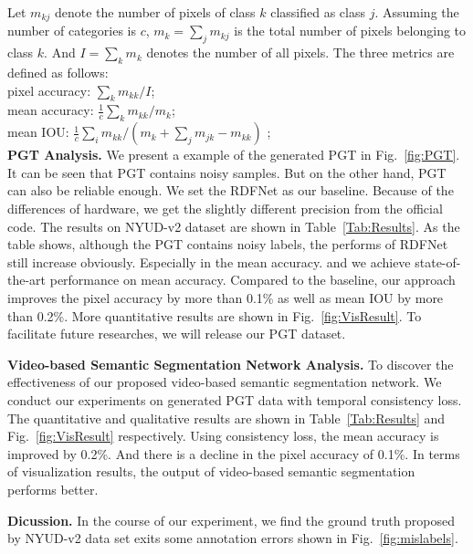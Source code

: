 %
Let $m_{kj}$ denote the number of pixels of class ${k}$ classified as class ${j}$.
%
Assuming the number of categories is $c$, $m_{k} = \sum_{j}m_{kj}$ is the total number of pixels belonging to class $k$. 
%
And $I = \sum_{k}m_{k}$ denotes the number of all pixels.
%
The three metrics are defined as follows:\\
\renewcommand{\baselinestretch}{1.0}\indent\text{---} pixel accuracy: $\sum_{k}m_{kk}/I$;\\
\indent\text{---} mean accuracy: $\frac{1}{c}\sum_{k}m_{kk}/m_{k}$;\\
\indent\text{---} mean IOU: $\frac{1}{c}\sum_{i}m_{kk}/(m_{k}+\sum_{j}m_{jk}-m_{kk})$ ;\\


{\bf PGT Analysis.} We present a example of the generated PGT in Fig.~\ref{fig:PGT}.
%
It can be seen that PGT contains noisy samples. 
%
But on the other hand, PGT can also be reliable enough.
%
We set the RDFNet as our baseline.
%
Because of the differences of hardware, we get the slightly different precision from the official code.
%
The results on NYUD-v2 dataset are shown in Table~\ref{Tab:Results}.
%
As the table shows, although the PGT contains noisy labels, the performs of RDFNet still increase obviously. 
%
Especially in the mean accuracy.
%
and we achieve state-of-the-art performance on mean accuracy.
%
Compared to the baseline, our approach improves the pixel accuracy by more than 0.1\% as well as mean IOU by more than 0.2\%.
%
More quantitative results are shown in Fig.~\ref{fig:VisResult}.
%
To facilitate future researches, we will release our PGT dataset.

{\bf{Video-based Semantic Segmentation Network Analysis.}} 
To discover the effectiveness of our proposed video-based semantic segmentation network. 
%
We conduct our experiments on generated PGT data with temporal consistency loss.
%
The quantitative and qualitative results are shown in Table~\ref{Tab:Results} and
Fig.~\ref{fig:VisResult} respectively.
%
Using consistency loss, the mean accuracy is improved by 0.2\%.
%
And there is a decline in the pixel accuracy of 0.1\%.
%
In terms of visualization results, the output of video-based semantic segmentation performs better.

{\bf{Dicussion.}} In the course of our experiment, we find the ground truth proposed by NYUD-v2 data set exits some annotation errors shown in Fig.~\ref{fig:mislabels}.

